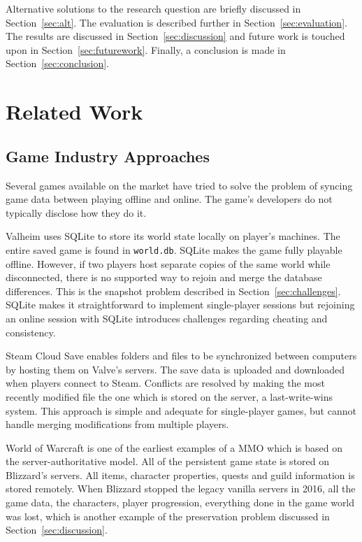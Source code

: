 \documentclass{article}
\begin{document}
Alternative solutions to the research question are briefly discussed in Section~\ref{sec:alt}. The evaluation is described further in Section~\ref{sec:evaluation}. The results are discussed in Section~\ref{sec:discussion} and future work is touched upon in Section~\ref{sec:futurework}. Finally, a conclusion is made in Section~\ref{sec:conclusion}.

\newpage

\section{Related Work}
\label{sec:relatedwork}

\subsection{Game Industry Approaches}

Several games available on the market have tried to solve the problem of syncing game data between playing offline and online. The game's developers do not typically disclose how they do it.

Valheim \autocite{valheim} uses SQLite to store its world state locally on player's machines. The entire saved game is found in \texttt{world.db}. SQLite makes the game fully playable offline. However, if two players host separate copies of the same world while disconnected, there is no supported way to rejoin and merge the database differences. This is the snapshot problem described in Section~\ref{sec:challenges}. SQLite makes it straightforward to implement single-player sessions but rejoining an online session with SQLite introduces challenges regarding cheating and consistency.

Steam Cloud Save \autocite{steamcloud} enables folders and files to be synchronized between computers by hosting them on Valve's servers. The save data is uploaded and downloaded when players connect to Steam. Conflicts are resolved by making the most recently modified file the one which is stored on the server, a last-write-wins system. This approach is simple and adequate for single-player games, but cannot handle merging modifications from multiple players.

World of Warcraft \autocite{wow} is one of the earliest examples of a MMO which is based on the server-authoritative model. All of the persistent game state is stored on Blizzard's servers. All items, character properties, quests and guild information is stored remotely. When Blizzard stopped the legacy vanilla servers in 2016, all the game data, the characters, player progression, everything done in the game world was lost, which is another example of the preservation problem discussed in Section~\ref{sec:discussion}.
\end{document}
